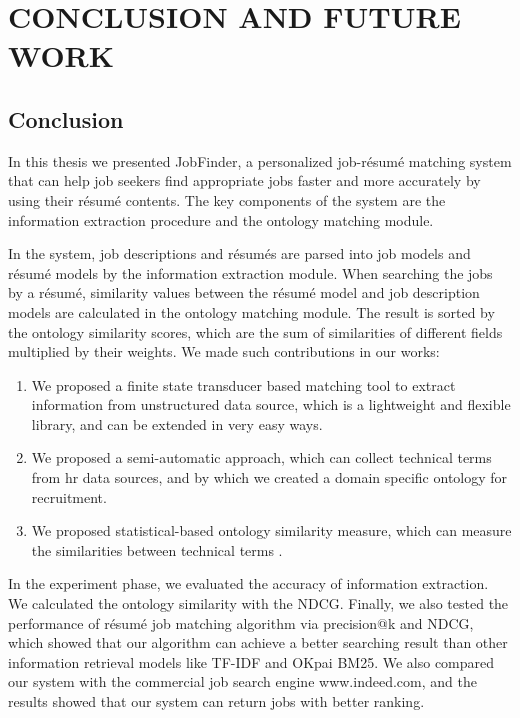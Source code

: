 \chapter{CONCLUSION AND FUTURE WORK}

\section{Conclusion}
In this thesis we presented JobFinder, a personalized job-r\'esum\'e matching system that can help job seekers find appropriate jobs faster and more accurately by using their r\'esum\'e contents. The key components of the system are the information extraction procedure and the ontology matching module.

In the system, job descriptions and r\'esum\'es are parsed into job models and r\'esum\'e models by the information extraction module. When searching the jobs by a r\'esum\'e, similarity values between the r\'esum\'e model and job description models are calculated in the ontology matching module. The result is sorted by the ontology similarity scores, which are the sum of similarities of different fields multiplied by their weights.
We made such contributions in our works:

\begin{enumerate}
    \item  We proposed a finite state transducer based matching tool to extract information from unstructured data source, which is a lightweight and flexible library, and can be extended in very easy ways.
    \item  We proposed a semi-automatic approach, which can collect technical terms from hr data sources, and by which we created a domain specific ontology for recruitment.
    \item  We proposed statistical-based ontology similarity measure, which can measure the similarities between technical terms .
\end{enumerate}

In the experiment phase, we evaluated the accuracy of information extraction. We calculated the ontology similarity with the NDCG. Finally, we also tested the performance of r\'esum\'e job matching algorithm via precision@k and NDCG, which showed that our algorithm can achieve a better searching result than other information retrieval models like TF-IDF and OKpai BM25. We also compared our system with the commercial job search engine www.indeed.com, and the results showed that our system can return jobs with better ranking.


